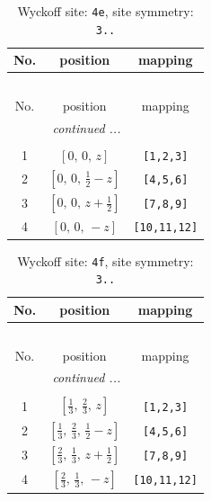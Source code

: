\documentclass[fleqn,8pt]{jsarticle}
\begin{document}
\begin{longtable}{ccc}
\caption{Wyckoff site: {\tt 4e}, site symmetry: {\tt 3..}}
 \\
 \hline \hline
No. & position & mapping \\ \hline \endfirsthead

\multicolumn{2}{l}{\tablename\ \thetable{}} \\
 \hline \hline
No. & position & mapping \\ \hline \endhead

 \hline \hline
\multicolumn{2}{r}{\footnotesize\it continued ...} \\ \endfoot

 \hline \hline
\multicolumn{2}{r}{} \\ \endlastfoot

1 & $\left[ 0,\, 0,\, z \right]$ & {\tt [1,2,3]} \\ \hline
2 & $\left[ 0,\, 0,\, \frac{1}{2} - z \right]$ & {\tt [4,5,6]} \\ \hline
3 & $\left[ 0,\, 0,\, z + \frac{1}{2} \right]$ & {\tt [7,8,9]} \\ \hline
4 & $\left[ 0,\, 0,\, - z \right]$ & {\tt [10,11,12]} \\
\end{longtable}
\renewcommand{\arraystretch}{1.2}
\begin{longtable}{ccc}
\caption{Wyckoff site: {\tt 4f}, site symmetry: {\tt 3..}}
 \\
 \hline \hline
No. & position & mapping \\ \hline \endfirsthead

\multicolumn{2}{l}{\tablename\ \thetable{}} \\
 \hline \hline
No. & position & mapping \\ \hline \endhead

 \hline \hline
\multicolumn{2}{r}{\footnotesize\it continued ...} \\ \endfoot

 \hline \hline
\multicolumn{2}{r}{} \\ \endlastfoot

1 & $\left[ \frac{1}{3},\, \frac{2}{3},\, z \right]$ & {\tt [1,2,3]} \\ \hline
2 & $\left[ \frac{1}{3},\, \frac{2}{3},\, \frac{1}{2} - z \right]$ & {\tt [4,5,6]} \\ \hline
3 & $\left[ \frac{2}{3},\, \frac{1}{3},\, z + \frac{1}{2} \right]$ & {\tt [7,8,9]} \\ \hline
4 & $\left[ \frac{2}{3},\, \frac{1}{3},\, - z \right]$ & {\tt [10,11,12]} \\
\end{longtable}
\end{document}
